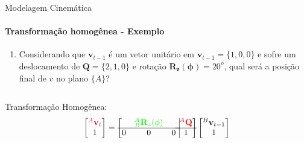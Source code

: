 \documentclass[aspectratio=169]{beamer}
\begin{document}
\begin{frame}{Modelagem Cinemática}
    \framesubtitle{Transformação homogênea - Exemplo}
    \begin{enumerate}
        \item Considerando que $\mathbf{v}_{t-1}$ é um vetor unitário em $\mathbf{v}_{t-1}=\{1,0,0\}$ e sofre um deslocamento de $\mathbf{Q}=\{2,1,0\}$ e rotação $\mathbf{R_z(\phi)}=20^o$, qual será a posição final de $v$ no plano $\{A\}$?
    \end{enumerate}
    \begin{columns}
        \begin{column}[c]{0.5\textwidth}
            
        \end{column}
        \begin{column}[c]{0.5\textwidth}
            
        \end{column}
    \end{columns}
    Transformação Homogênea:
    \begin{equation*}
        \begin{bmatrix}
            \color{purple}{{}^A \mathbf{v}_{t}} \\ 1
        \end{bmatrix}
        =
        \left[
            \begin{matrix}
                  & \color{green}{{}_B^A\mathbf{R}_z(\phi)} &   \\ \hline
                0 & 0                                       & 0 \\
            \end{matrix} \right.
            \left.
            \vline
            \begin{matrix}
                \color{red}{{}^A\mathbf{Q}} \\ \hline
                1
            \end{matrix} \right]
        \begin{bmatrix}
            {}^B \mathbf{v}_{t-1} \\
            1
        \end{bmatrix}
    \end{equation*}
\end{frame}
\end{document}
